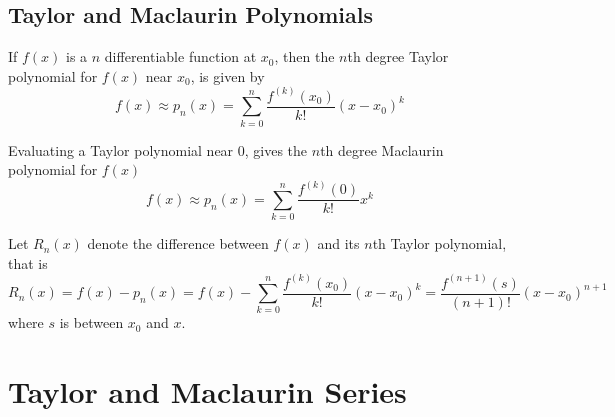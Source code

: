 \documentclass{article}
\begin{document}
\subsection{Taylor and Maclaurin Polynomials}
\begin{theorem}
    If $f(x)$ is a $n$ differentiable function at $x_0$, then the $n$th degree Taylor polynomial for $f(x)$ near $x_0$, is given by
    \begin{equation*}
        f(x) \approx p_n(x) = \sum_{k=0}^n \frac{f^{\left( k \right)}(x_0)}{k!} \left( x-x_0 \right)^k
    \end{equation*}
\end{theorem}
\begin{theorem}
    Evaluating a Taylor polynomial near $0$, gives the $n$th degree Maclaurin polynomial for $f(x)$
    \begin{equation*}
        f(x) \approx p_n(x) = \sum_{k=0}^n \frac{f^{\left( k \right)}(0)}{k!} x^k
    \end{equation*}
\end{theorem}
\begin{theorem}
    Let $R_n(x)$ denote the difference between $f(x)$ and its $n$th Taylor polynomial, that is
    \begin{equation*}
        R_n(x) = f(x) - p_n(x) = f(x) - \sum_{k=0}^n \frac{f^{\left( k \right)}(x_0)}{k!} \left( x-x_0 \right)^k = \frac{f^{\left( n+1 \right)}(s)}{\left( n+1 \right)!} \left( x-x_0 \right)^{n+1}
    \end{equation*}
    where $s$ is between $x_0$ and $x$.
\end{theorem}
\newpage
\section{Taylor and Maclaurin Series}
\end{document}
